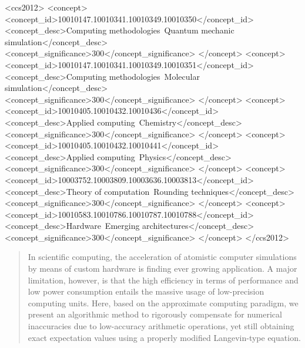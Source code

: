 \documentclass[format=acmsmall,urlbreakonhyphens]{acmart}
\begin{document}





\begin{CCSXML}
<ccs2012>
<concept>
<concept_id>10010147.10010341.10010349.10010350</concept_id>
<concept_desc>Computing methodologies~Quantum mechanic simulation</concept_desc>
<concept_significance>300</concept_significance>
</concept>
<concept>
<concept_id>10010147.10010341.10010349.10010351</concept_id>
<concept_desc>Computing methodologies~Molecular simulation</concept_desc>
<concept_significance>300</concept_significance>
</concept>
<concept>
<concept_id>10010405.10010432.10010436</concept_id>
<concept_desc>Applied computing~Chemistry</concept_desc>
<concept_significance>300</concept_significance>
</concept>
<concept>
<concept_id>10010405.10010432.10010441</concept_id>
<concept_desc>Applied computing~Physics</concept_desc>
<concept_significance>300</concept_significance>
</concept>
<concept>
<concept_id>10003752.10003809.10003636.10003813</concept_id>
<concept_desc>Theory of computation~Rounding techniques</concept_desc>
<concept_significance>300</concept_significance>
</concept>
<concept>
<concept_id>10010583.10010786.10010787.10010788</concept_id>
<concept_desc>Hardware~Emerging architectures</concept_desc>
<concept_significance>300</concept_significance>
</concept>
</ccs2012>
\end{CCSXML}




\begin{abstract}
In scientific computing, the acceleration of atomistic computer simulations by means of custom hardware is finding ever growing application.
A major limitation, however, is that the high efficiency in terms of performance and low power consumption entails the massive usage of low-precision computing units. Here, based on the approximate computing paradigm, we present an algorithmic method to rigorously compensate for numerical inaccuracies due to low-accuracy arithmetic operations, yet still obtaining exact expectation values using a properly modified Langevin-type equation. %
\end{abstract}
\end{document}
